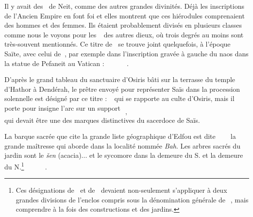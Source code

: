 \documentclass[a4paper, 11pt, oneside]{article}
\newcommand*\hieroglyhicsAAAH{}
\newcommand*\hieroglyhicsAAAO{}
\newcommand*\hieroglyhicsAAAQ{}
\newcommand*\hieroglyhicsAABM{}
\newcommand*\hieroglyhicsAADL{}
\newcommand*\hieroglyhicsAADV{\raisebox{0.5ex}{}}
\newcommand*\hieroglyhicsAAEB{}
\newcommand*\hieroglyhicsAAEF{}
\newcommand*\hieroglyhicsAAEK{}
\newcommand*\hieroglyhicsAAFH{}
\newcommand*\hieroglyhicsAAFK{}
\newcommand*\hieroglyhicsAAFL{}
\newcommand*\hieroglyhicsAAFM{}
\newcommand*\hieroglyhicsAAFN{\raisebox{0.5ex}{}}
\newcommand*\hieroglyhicsAAFQ{}
\newcommand*\hieroglyhicsAAFS{}
\newcommand*\hieroglyhicsAAHA{}
\newcommand*\hieroglyhicsAAHC{}
\newcommand*\hieroglyhicsAAJN{}
\newcommand*\hieroglyhicsAANA{}
\newcommand*\hieroglyhicsAANP{}
\newcommand*\hieroglyhicsAAOR{}
\newcommand*\hieroglyhicsAAQJ{}
\newcommand*\hieroglyhicsAAQK{}
\newcommand*\hieroglyhicsAAQL{}
\newcommand*\hieroglyhicsAAQM{}
\newcommand*\hieroglyhicsAAQN{}
\newcommand*\hieroglyhicsAAQO{}
\newcommand*\hieroglyhicsAAQP{}
\newcommand*\hieroglyhicsAAQQ{}
\newcommand*\hieroglyhicsAAQR{}
\newcommand*\hieroglyhicsAAQS{}
\newcommand*\hieroglyhicsAAQT{}
\newcommand*\hieroglyhicsAAQU{}
\newcommand*\hieroglyhicsAAQV{}
\begin{document}
Il y avait des $\hieroglyhicsAAEK\:\hieroglyhicsAAHC$ de Neit, comme des autres grandes divinités. Déjà les inscriptions de l'Ancien Empire en font foi et elles montrent que ces hiérodules comprenaient des hommes et des femmes. Ils étaient probablement divisés en plusieurs classes comme nous le voyons pour les $\hieroglyhicsAAEK\:\hieroglyhicsAAHC\:\hieroglyhicsAAEF$ des autres dieux, où trois degrés au moins sont très-souvent mentionnés. Ce titre de $\hieroglyhicsAAEK\:\hieroglyhicsAAHC$ se trouve joint quelquefois, à l'époque Saïte, avec celui de $\hieroglyhicsAAOR\:\hieroglyhicsAAHA$, par exemple dans l'inscription gravée à gauche du naos dans la statue de Pefaneit au Vatican : $\hieroglyhicsAAOR\:\hieroglyhicsAAHA\:\hieroglyhicsAAEK\allowbreak\:\hieroglyhicsAAHC\:\hieroglyhicsAAAQ\:\hieroglyhicsAAAO\allowbreak\:\hieroglyhicsAAAH\:\hieroglyhicsAANA
\:\hieroglyhicsAADL\:\hieroglyhicsAAFN\allowbreak\:\hieroglyhicsAAQJ\:\hieroglyhicsAAFK\allowbreak\:\hieroglyhicsAAAQ\:\hieroglyhicsAAAO$.

D'après le grand tableau du sanctuaire d'Osiris bâti sur la terrasse du temple d'Hathor à Dendérah, le prêtre envoyé pour représenter Saïs dans la procession solennelle est désigné par ce titre : $\hieroglyhicsAAJN\:\hieroglyhicsAAQK\:\hieroglyhicsAAEB$ qui se rapporte au culte d'Osiris, mais il porte pour insigne l'arc sur un support $\hieroglyhicsAAQL$, $\hieroglyhicsAAQM$ qui devait être une des marques distinctives du sacerdoce de Saïs.

La barque sacrée que cite la grande liste géographique d'Edfou est dite $\hieroglyhicsAAFS\:\hieroglyhicsAAFQ\:\hieroglyhicsAAQN\allowbreak\:\hieroglyhicsAAFH\:\hieroglyhicsAABM\:\hieroglyhicsAANP\allowbreak\:\hieroglyhicsAAFL\:\hieroglyhicsAAFM$ la grande maîtresse qui aborde dans la localité nommée \emph{Bah}. Les arbres sacrés du jardin sont le \emph{šen} (acacia)... et le sycomore dans la demeure du S. et la demeure du N.\footnote{Ces désignations de $\hieroglyhicsAAQS\:\hieroglyhicsAAQT$ et de $\hieroglyhicsAAQU\:\hieroglyhicsAAQT$ devaient non-seulement s'appliquer à deux grandes divisions de l'enclos compris sous la dénomination générale de $\hieroglyhicsAAHA\:\hieroglyhicsAAAQ\:\hieroglyhicsAAAO$, mais comprendre à la fois des constructions et des jardins.} $\hieroglyhicsAAQO\:\hieroglyhicsAAQP\:\hieroglyhicsAAQQ\allowbreak\:\hieroglyhicsAAAH\:\hieroglyhicsAAEK\:\hieroglyhicsAAQP\allowbreak\:\hieroglyhicsAAQR\:\hieroglyhicsAAQP\:\hieroglyhicsAADV\allowbreak\:\hieroglyhicsAAQS\:\hieroglyhicsAAQT\allowbreak\:\hieroglyhicsAAQU\:\hieroglyhicsAAQV$.
\end{document}
